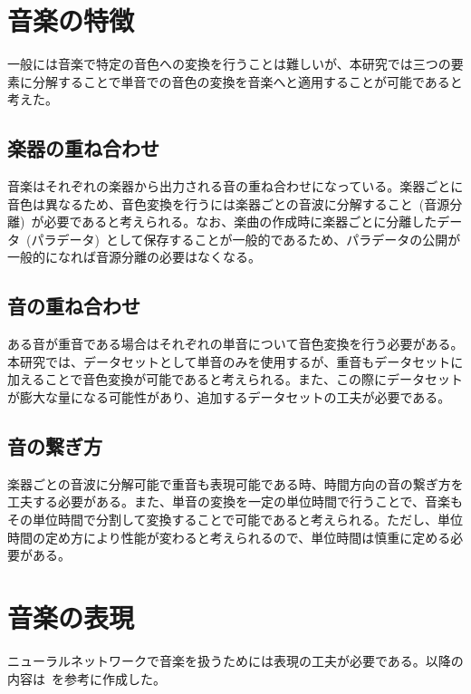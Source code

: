 
\section{音楽の特徴}

一般には音楽で特定の音色への変換を行うことは難しいが、本研究では三つの要素に分解することで単音での音色の変換を音楽へと適用することが可能であると考えた。

\subsection{楽器の重ね合わせ}
    
音楽はそれぞれの楽器から出力される音の重ね合わせになっている。楽器ごとに音色は異なるため、音色変換を行うには楽器ごとの音波に分解すること~(音源分離)~が必要であると考えられる。なお、楽曲の作成時に楽器ごとに分離したデータ~(パラデータ)~として保存することが一般的であるため、パラデータの公開が一般的になれば音源分離の必要はなくなる。

\subsection{音の重ね合わせ}

ある音が重音である場合はそれぞれの単音について音色変換を行う必要がある。本研究では、データセットとして単音のみを使用するが、重音もデータセットに加えることで音色変換が可能であると考えられる。また、この際にデータセットが膨大な量になる可能性があり、追加するデータセットの工夫が必要である。

\subsection{音の繋ぎ方}

楽器ごとの音波に分解可能で重音も表現可能である時、時間方向の音の繋ぎ方を工夫する必要がある。また、単音の変換を一定の単位時間で行うことで、音楽もその単位時間で分割して変換することで可能であると考えられる。ただし、単位時間の定め方により性能が変わると考えられるので、単位時間は慎重に定める必要がある。


\section{音楽の表現}
\label{sec:preprocess}

ニューラルネットワークで音楽を扱うためには表現の工夫が必要である。以降の内容は~\cite{musictutorial}を参考に作成した。

